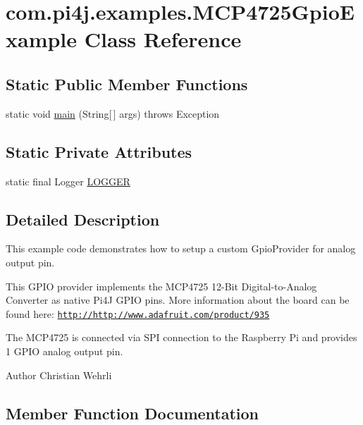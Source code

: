 \hypertarget{classcom_1_1pi4j_1_1examples_1_1MCP4725GpioExample}{}\section{com.\+pi4j.\+examples.\+M\+C\+P4725\+Gpio\+Example Class Reference}
\label{classcom_1_1pi4j_1_1examples_1_1MCP4725GpioExample}
\subsection*{Static Public Member Functions}
\begin{DoxyCompactItemize}
\item 
static void \hyperlink{classcom_1_1pi4j_1_1examples_1_1MCP4725GpioExample_a2160bb6445ca5002a3f70f042817b869}{main} (String\mbox{[}$\,$\mbox{]} args)  throws Exception 
\end{DoxyCompactItemize}
\subsection*{Static Private Attributes}
\begin{DoxyCompactItemize}
\item 
static final Logger \hyperlink{classcom_1_1pi4j_1_1examples_1_1MCP4725GpioExample_a08fe11ede756c66903f659463cab8cbc}{L\+O\+G\+G\+E\+R}
\end{DoxyCompactItemize}


\subsection{Detailed Description}
This example code demonstrates how to setup a custom Gpio\+Provider for analog output pin. 

This G\+P\+I\+O provider implements the M\+C\+P4725 12-\/\+Bit Digital-\/to-\/\+Analog Converter as native Pi4\+J G\+P\+I\+O pins. More information about the board can be found here\+: \href{http://http://www.adafruit.com/product/935}{\tt http\+://http\+://www.\+adafruit.\+com/product/935} 

The M\+C\+P4725 is connected via S\+P\+I connection to the Raspberry Pi and provides 1 G\+P\+I\+O analog output pin. 

\begin{DoxyAuthor}{Author}
Christian Wehrli 
\end{DoxyAuthor}


\subsection{Member Function Documentation}
\hypertarget{classcom_1_1pi4j_1_1examples_1_1MCP4725GpioExample_a2160bb6445ca5002a3f70f042817b869}{}
